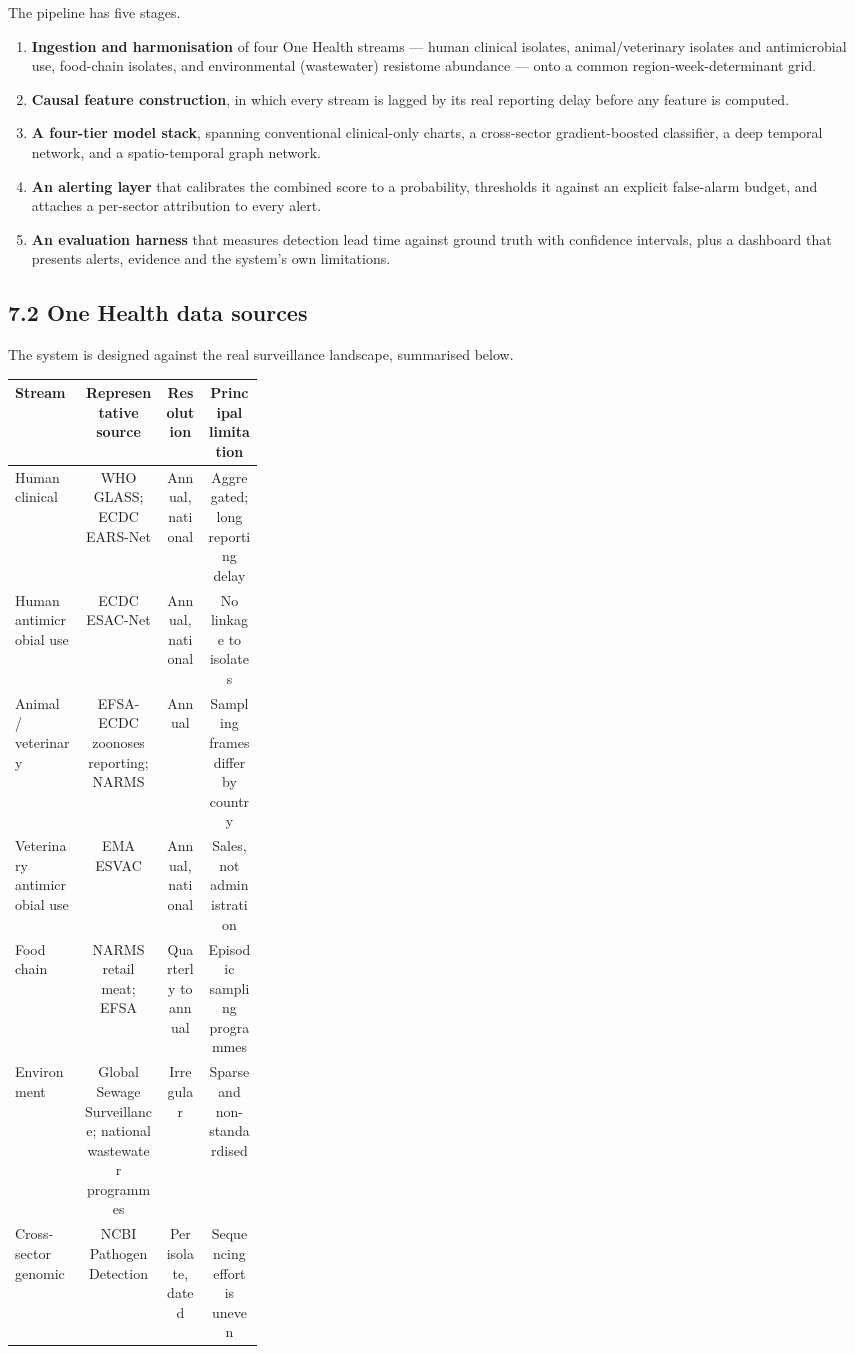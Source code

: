 \documentclass[11pt,a4paper]{article}
\begin{document}
The pipeline has five stages.

\begin{enumerate}[leftmargin=1.3em,itemsep=2pt]
  \item \textbf{Ingestion and harmonisation} of four One Health streams — human clinical isolates, animal/veterinary isolates and antimicrobial use, food-chain isolates, and environmental (wastewater) resistome abundance — onto a common region-week-determinant grid.
  \item \textbf{Causal feature construction}, in which every stream is lagged by its real reporting delay before any feature is computed.
  \item \textbf{A four-tier model stack}, spanning conventional clinical-only charts, a cross-sector gradient-boosted classifier, a deep temporal network, and a spatio-temporal graph network.
  \item \textbf{An alerting layer} that calibrates the combined score to a probability, thresholds it against an explicit false-alarm budget, and attaches a per-sector attribution to every alert.
  \item \textbf{An evaluation harness} that measures detection lead time against ground truth with confidence intervals, plus a dashboard that presents alerts, evidence and the system's own limitations.
\end{enumerate}

\subsection*{7.2 One Health data sources}

The system is designed against the real surveillance landscape, summarised below.

\begin{center}\small
\begin{tabular}{p{0.29\linewidth}ccc}\toprule
\textbf{Stream} & \textbf{Representative source} & \textbf{Resolution} & \textbf{Principal limitation} \\ \midrule
Human clinical & WHO GLASS; ECDC EARS-Net & Annual, national & Aggregated; long reporting delay \\
Human antimicrobial use & ECDC ESAC-Net & Annual, national & No linkage to isolates \\
Animal / veterinary & EFSA-ECDC zoonoses reporting; NARMS & Annual & Sampling frames differ by country \\
Veterinary antimicrobial use & EMA ESVAC & Annual, national & Sales, not administration \\
Food chain & NARMS retail meat; EFSA & Quarterly to annual & Episodic sampling programmes \\
Environment & Global Sewage Surveillance; national wastewater programmes & Irregular & Sparse and non-standardised \\
Cross-sector genomic & NCBI Pathogen Detection & Per isolate, dated & Sequencing effort is uneven \\
\bottomrule\end{tabular}
\end{center}
\end{document}
